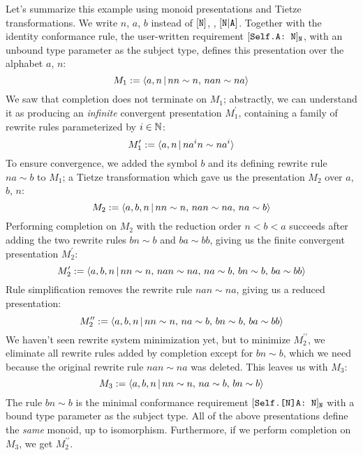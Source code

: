 \documentclass[../generics]{subfiles}
\begin{document}
\begin{example}
Let's summarize this example using monoid presentations and Tietze transformations. We write $n$, $a$, $b$ instead of $[\texttt{N}]$, \nA, $[\texttt{N}|\texttt{A}]$. Together with the identity conformance rule, the user-written requirement $[\texttt{Self.A:~N}]_\texttt{N}$, with an unbound type parameter as the subject type, defines this presentation over the alphabet $a$, $n$:
\[M_1 := \langle a,n\,|\,nn\sim n,\,nan\sim na\rangle\]
We saw that completion does not terminate on $M_1$; abstractly, we can understand it as producing an \emph{infinite} convergent presentation $M_1^\prime$, containing a family of rewrite rules parameterized by $i\in\mathbb{N}$:
\[M_1^\prime := \langle a,n\,|\,na^in\sim na^i\rangle\]
To ensure convergence, we added the symbol $b$ and its defining rewrite rule $na\sim b$ to $M_1$; a Tietze transformation which gave us the presentation $M_2$ over $a$, $b$, $n$:
\[M_2 := \langle a,b,n\,|\,nn\sim n,\,nan\sim na,\,na\sim b\rangle\]
Performing completion on $M_2$ with the reduction order $n<b<a$ succeeds after adding the two rewrite rules $bn\sim b$ and $ba\sim bb$, giving us the finite convergent presentation $M_2^\prime$:
\[M_2^\prime := \langle a,b,n\,|\,nn\sim n,\,nan\sim na,\,na\sim b,\,bn\sim b,\,ba\sim bb\rangle\]
Rule simplification removes the rewrite rule $nan\sim na$, giving us a reduced presentation:
\[M_2^{\prime\prime} := \langle a,b,n\,|\,nn\sim n,\,na\sim b,\,bn\sim b,\,ba\sim bb\rangle\]
We haven't seen rewrite system minimization yet, but to minimize $M_2^{\prime\prime}$, we eliminate all rewrite rules added by completion except for $bn\sim b$, which we need because the original rewrite rule $nan\sim na$ was deleted. This leaves us with $M_3$:
\[M_3:=\langle a,b,n\,|\,nn\sim n,\,na\sim b,\,bn\sim b\rangle\]
The rule $bn\sim b$ is the minimal conformance requirement $[\texttt{Self.[N]A:~N}]_\texttt{N}$ with a bound type parameter as the subject type. All of the above presentations define the \emph{same} monoid, up to isomorphism. Furthermore, if we perform completion on $M_3$, we get $M_2^{\prime\prime}$.
\end{example}
\end{document}
